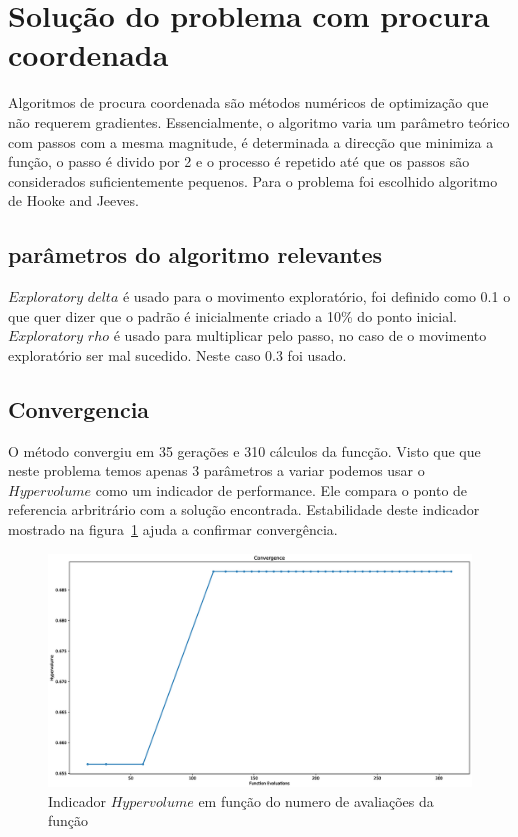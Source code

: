 \documentclass[a4paper,12pt]{article}
\begin{document}
\section{Solução do problema com procura coordenada}

Algoritmos de procura coordenada são métodos numéricos de optimização que não requerem gradientes. Essencialmente, o algoritmo varia um parâmetro teórico com passos com a mesma magnitude, é determinada a direcção que minimiza a função, o passo é divido por 2 e o processo é repetido até que os passos são considerados suficientemente pequenos. Para o problema foi escolhido algoritmo de Hooke and Jeeves.

\subsection{parâmetros do algoritmo relevantes}

$Exploratory$ $delta$ é usado para o movimento exploratório, foi definido como 0.1 o que quer dizer que o padrão é inicialmente criado a 10\% do ponto inicial. $Exploratory$ $rho$ é usado para multiplicar pelo passo, no caso de o movimento exploratório ser mal sucedido. Neste caso 0.3 foi usado.

\subsection{Convergencia}

O método convergiu em 35 gerações e 310 cálculos da funcção. Visto que que neste problema temos apenas 3 parâmetros a variar podemos usar o $Hypervolume$ como um indicador de performance. Ele compara o ponto de referencia arbritrário com a solução encontrada. Estabilidade deste indicador mostrado na figura~\ref{fig:hyper} ajuda a confirmar convergência.

\begin{figure}[h]
\begin{center}
\includegraphics[scale=0.2]{PS_convergence.eps}
\end{center}
\caption{Indicador $Hypervolume$ em função do numero de avaliações da função}
\label{fig:hyper}
\end{figure}
\end{document}
